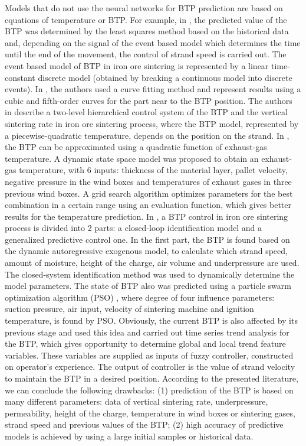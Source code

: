 \documentclass[AMS,STIX2COL]{WileyNJD-v2}
\begin{document}
Models that do not use the neural networks for BTP prediction are based on equations of temperature or BTP. For example, in \cite{Kwon1999}, the predicted value of the BTP was determined by the least squares method based on the historical data and, depending on the signal of the event based model which determines the time until the end of the  movement, the control of strand speed is carried out. The event based model of BTP in iron ore sintering is represented by a linear time-constant discrete model (obtained by breaking a continuous model into discrete events). 
In \cite{Kim2014}, the authors used a curve fitting method and represent results using a cubic and fifth-order curves for the part near to the BTP position.
The authors in \cite{Wang2013} describe a two-level hierarchical control system of the BTP and the vertical sintering rate in iron ore sintering process, where the BTP model, represented by a piecewise-quadratic temperature, depends on the position on the strand.
In \cite{Cao2018}, the BTP can be approximated using a quadratic function of exhaust-gas temperature. A dynamic state space model was proposed to obtain an exhaust-gas temperature, with 6 inputs: thickness of the material layer, pallet velocity, negative pressure in the wind boxes and temperatures of exhaust gases in three previous wind boxes. A grid search algorithm optimizes parameters for the best combination in a certain range using an evaluation function, which gives better results for the temperature prediction.
In \cite{Wu2012a}, a BTP control in iron ore sintering process is divided into 2 parts: a closed-loop identification model and a generalized predictive control one. In the first part, the BTP is found based on the dynamic autoregressive exogenous model, to calculate which strand speed, amount of moisture, height of the charge, air volume and underpressure are used. The closed-system identification method was used to dynamically determine the model parameters. 
The state of BTP also was predicted using a particle swarm optimization algorithm (PSO) \cite{Shi2016}, where degree of four influence parameters: suction pressure, air input, velocity of sintering machine and ignition temperature, is found by PSO. 
Obviously, the current BTP is also affected by its previous
stage and \cite{Du20191} used this idea and carried out time series trend analysis for the BTP, which gives opportunity to determine global and local trend feature variables. These variables are supplied as inputs of fuzzy controller, constructed on operator's experience. The output of controller is the value of strand velocity to maintain the BTP in a desired position.
According to the presented literature, we can conclude the following drawbacks: (1) prediction of the BTP is based on many different parameters: data of vertical sintering rate, underpressure, permeability, height of the charge, temperature in wind boxes or sintering gases, strand speed and previous values of the BTP; (2) high accuracy of predictive models is achieved by using a large initial samples or historical data.
\end{document}
